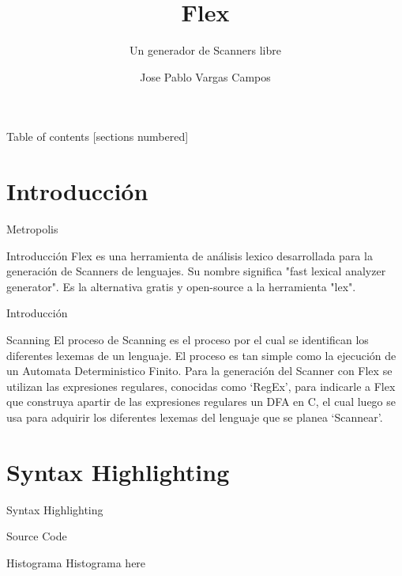 \documentclass[10pt]{beamer}
\title{Flex}
\subtitle{Un generador de Scanners libre}
\date{}
\author{Jose Pablo Vargas Campos \newline 2013116365}
\institute{Instituto Tecnológico de Costa Rica\newline Compiladores e Intérpretes \newline Semestre 2017 }
\begin{document}
\maketitle

\begin{frame}{Table of contents}
  [sections numbered]
  \tableofcontents[hideallsubsections]
\end{frame}

\section{Introducción}

\begin{frame}[fragile]{Metropolis}


\begin{alertblock}{Introducción}
		Flex es una herramienta de análisis lexico desarrollada para la generación de Scanners de lenguajes. Su nombre significa "fast lexical analyzer generator". Es la alternativa gratis y open-source a la herramienta "lex". 
\end{alertblock}
    
\end{frame}
    
\begin{frame}[fragile]{Introducción}

	\begin{alertblock}{Scanning}
		El proceso de Scanning es el proceso por el cual se identifican los diferentes lexemas de un lenguaje. El proceso es tan simple como la ejecución de un Automata Deterministico Finito. Para la generación del Scanner con Flex se utilizan las expresiones regulares, conocidas como `RegEx', para indicarle a Flex que construya apartir de las expresiones regulares un DFA en C, el cual luego se usa para adquirir los diferentes lexemas del lenguaje que se planea `Scannear'.

	\end{alertblock}

\end{frame}


\section{Syntax Highlighting}

\begin{frame}{Syntax Highlighting}
\begin{alertblock}{Source Code}
	\end{alertblock}


\end{frame}
\begin{frame}[fragile]{Histograma}
	Histograma here
\end{frame}
\end{document}
